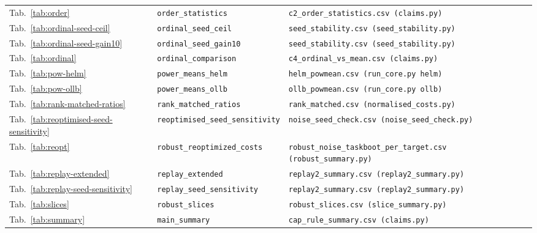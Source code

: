 \begin{longtable}{@{}p{0.55in} p{1.55in} p{3.0in}@{}}
Tab.~\ref{tab:order} & \texttt{order\_\allowbreak statistics} & \texttt{c2\_\allowbreak order\_\allowbreak statistics.csv (claims.py)} \\
Tab.~\ref{tab:ordinal-seed-ceil} & \texttt{ordinal\_\allowbreak seed\_\allowbreak ceil} & \texttt{seed\_\allowbreak stability.csv (seed\_\allowbreak stability.py)} \\
Tab.~\ref{tab:ordinal-seed-gain10} & \texttt{ordinal\_\allowbreak seed\_\allowbreak gain10} & \texttt{seed\_\allowbreak stability.csv (seed\_\allowbreak stability.py)} \\
Tab.~\ref{tab:ordinal} & \texttt{ordinal\_\allowbreak comparison} & \texttt{c4\_\allowbreak ordinal\_\allowbreak vs\_\allowbreak mean.csv (claims.py)} \\
Tab.~\ref{tab:pow-helm} & \texttt{power\_\allowbreak means\_\allowbreak helm} & \texttt{helm\_\allowbreak powmean.csv (run\_\allowbreak core.py helm)} \\
Tab.~\ref{tab:pow-ollb} & \texttt{power\_\allowbreak means\_\allowbreak ollb} & \texttt{ollb\_\allowbreak powmean.csv (run\_\allowbreak core.py ollb)} \\
Tab.~\ref{tab:rank-matched-ratios} & \texttt{rank\_\allowbreak matched\_\allowbreak ratios} & \texttt{rank\_\allowbreak matched.csv (normalised\_\allowbreak costs.py)} \\
Tab.~\ref{tab:reoptimised-seed-sensitivity} & \texttt{reoptimised\_\allowbreak seed\_\allowbreak sensitivity} & \texttt{noise\_\allowbreak seed\_\allowbreak check.csv (noise\_\allowbreak seed\_\allowbreak check.py)} \\
Tab.~\ref{tab:reopt} & \texttt{robust\_\allowbreak reoptimized\_\allowbreak costs} & \texttt{robust\_\allowbreak noise\_\allowbreak taskboot\_\allowbreak per\_\allowbreak target.csv (robust\_\allowbreak summary.py)} \\
Tab.~\ref{tab:replay-extended} & \texttt{replay\_\allowbreak extended} & \texttt{replay2\_\allowbreak summary.csv (replay2\_\allowbreak summary.py)} \\
Tab.~\ref{tab:replay-seed-sensitivity} & \texttt{replay\_\allowbreak seed\_\allowbreak sensitivity} & \texttt{replay2\_\allowbreak summary.csv (replay2\_\allowbreak summary.py)} \\
Tab.~\ref{tab:slices} & \texttt{robust\_\allowbreak slices} & \texttt{robust\_\allowbreak slices.csv (slice\_\allowbreak summary.py)} \\
Tab.~\ref{tab:summary} & \texttt{main\_\allowbreak summary} & \texttt{cap\_\allowbreak rule\_\allowbreak summary.csv (claims.py)} \\

\end{longtable}
